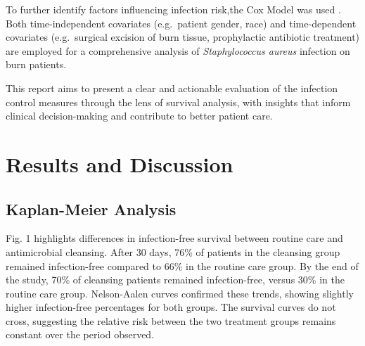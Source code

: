 \documentclass[12pt]{article}
\begin{document}
To further identify factors influencing infection risk,the Cox Model was
used \citep{cox1972}. Both time-independent covariates (e.g.~patient
gender, race) and time-dependent covariates (e.g.~surgical excision of
burn tissue, prophylactic antibiotic treatment) are employed for a
comprehensive analysis of \emph{Staphylococcus aureus} infection on burn
patients.

This report aims to present a clear and actionable evaluation of the
infection control measures through the lens of survival analysis, with
insights that inform clinical decision-making and contribute to better
patient care.

\section{Results and Discussion}\label{results-and-discussion}

\subsection{Kaplan-Meier Analysis}\label{kaplan-meier-analysis}

Fig. 1 highlights differences in infection-free survival between routine
care and antimicrobial cleansing. After 30 days, 76\% of patients in the
cleansing group remained infection-free compared to 66\% in the routine
care group. By the end of the study, 70\% of cleansing patients remained
infection-free, versus 30\% in the routine care group. Nelson-Aalen
curves confirmed these trends, showing slightly higher infection-free
percentages for both groups. The survival curves do not cross,
suggesting the relative risk between the two treatment groups remains
constant over the period observed.
\end{document}
